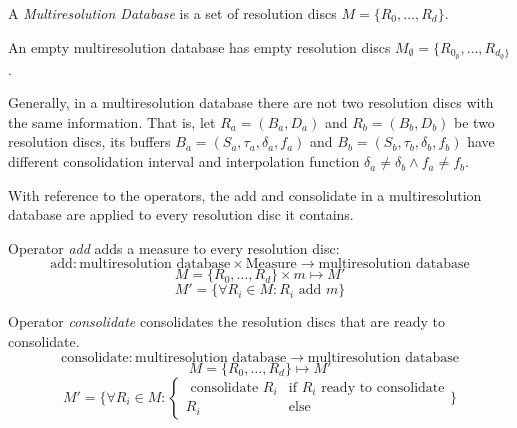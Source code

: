 \begin{definition}
  A \emph{Multiresolution Database} is a set of resolution discs
  $M=\{R_0,\dotsc,R_d\}$.
\end{definition}

An empty multiresolution database has empty resolution discs $M_{\emptyset}=\{R_{0_{\emptyset}},\dotsc,R_{d_{\emptyset}\}}$. 
 
Generally, in a multiresolution database there are not two resolution discs
with the same information. That is, let $R_a = (B_a, D_a)$ and $R_b =
(B_b, D_b)$ be two resolution discs, its buffers
$B_a=(S_a,\tau_a,\delta_a,f_a)$ and $B_b=(S_b,\tau_b,\delta_b,f_b)$
have different consolidation interval and interpolation function
$\delta_a \neq \delta_b \wedge f_a \neq f_b$.


With reference to the operators, the add and consolidate in a multiresolution database are applied to every resolution disc it contains.


\begin{definition}
  Operator \emph{add} adds a measure to every resolution disc:
  \[
  \text{add}: \text{multiresolution database} \times \text{Measure}
  \longrightarrow \text{multiresolution database}
  \]
  \[
  M=\{R_0,\dotsc,R_d\} \times m \mapsto M' 
  \]
  \[  
  M'= \{ \forall R_i\in M: R_i \text{ add } m \}
  \]
\end{definition}


\begin{definition}
  Operator \emph{consolidate} consolidates the resolution discs that
  are ready to consolidate.
  \[
  \text{consolidate}: \text{multiresolution database} \longrightarrow
  \text{multiresolution database}
  \]
  \[
  M=\{R_0,\dotsc,R_d\} \mapsto M'
  \]
  \[
  M'= \big\{
  \forall R_i\in M: 
  \begin{cases}
    \text{ consolidate } R_i & \text{if } R_i \text{ ready to consolidate} \\
    R_i & \text{else }
  \end{cases}\big\}
  \]
\end{definition}






